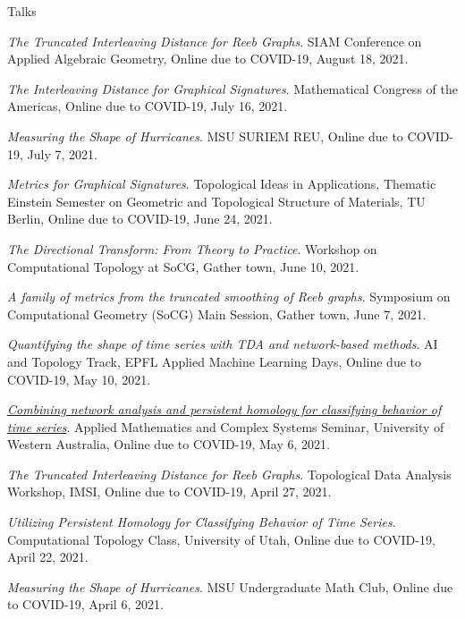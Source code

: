 \documentclass{resume} %
\begin{document}
\begin{rSection}{Talks}
\begin{etaremune}
\item\emph{The Truncated Interleaving Distance for Reeb Graphs}. SIAM Conference on Applied Algebraic Geometry, Online due to COVID-19, August 18, 2021. 

\item\emph{The Interleaving Distance for Graphical Signatures}. Mathematical Congress of the Americas, Online due to COVID-19, July 16, 2021. 

\item\emph{Measuring the Shape of Hurricanes}. MSU SURIEM REU, Online due to COVID-19, July 7, 2021. 

\item\emph{Metrics for Graphical Signatures}. Topological Ideas in Applications, Thematic Einstein Semester on Geometric and Topological Structure of Materials, TU Berlin, Online due to COVID-19, June 24, 2021. 

\item\emph{The Directional Transform: From Theory to Practice}. Workshop on Computational Topology at SoCG, Gather town, June 10, 2021. 

\item\emph{A family of metrics from the truncated smoothing of Reeb graphs}. Symposium on Computational Geometry (SoCG) Main Session, Gather town, June 7, 2021. 

\item\emph{Quantifying the shape of time series with TDA and network-based methods}. AI and Topology Track, EPFL Applied Machine Learning Days, Online due to COVID-19, May 10, 2021. 

\item\emph{\href{https://www.youtube.com/watch?v=EUVk-FXbIog}{Combining network analysis and persistent homology for classifying behavior of time series}}. Applied Mathematics and Complex Systems Seminar, University of Western Australia, Online due to COVID-19, May 6, 2021. 

\item\emph{The Truncated Interleaving Distance for Reeb Graphs}. Topological Data Analysis Workshop, IMSI, Online due to COVID-19, April 27, 2021. 

\item\emph{Utilizing Persistent Homology for Classifying Behavior of Time Series}. Computational Topology Class, University of Utah, Online due to COVID-19, April 22, 2021. 

\item\emph{Measuring the Shape of Hurricanes}. MSU Undergraduate Math Club, Online due to COVID-19, April 6, 2021. 


\end{etaremune}
\end{rSection}
\end{document}
